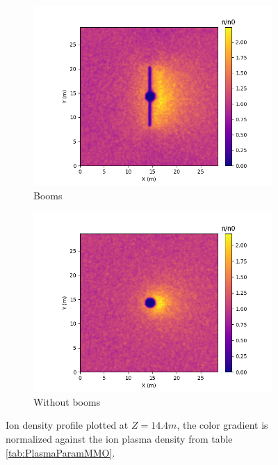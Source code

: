 \begin{center}
    \begin{figure}[H]
      \begin{subfigure}[b]{0.61\textwidth}
      \includegraphics[width=\textwidth]{figures/MMO/noPH/WB/I_noPH_WB.png}
      \caption{Booms}
      \label{fig:I_noPH_WB}
    \end{subfigure}
    \begin{subfigure}[b]{0.61\textwidth}
      \includegraphics[width=\textwidth]{figures/MMO/noPH/NB/I_noPH_NB.png}
      \caption{Without booms}
      \label{fig:I_noPH_NB}
    \end{subfigure}
  \label{fig:Ions_noPH}
  \caption{Ion density profile plotted at $Z = 14.4 m$, the color gradient is normalized against the ion plasma density from table \ref{tab:PlasmaParamMMO}.}
  \end{figure}
\end{center}


